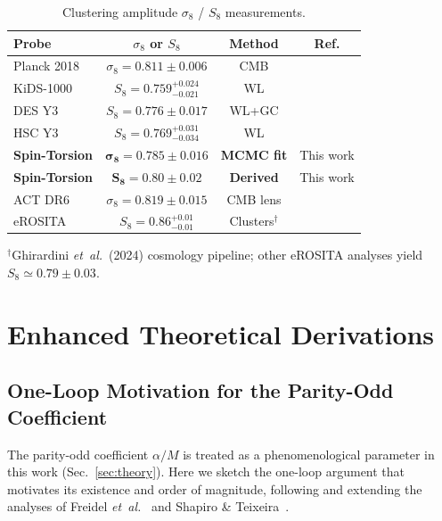 \documentclass[aps,prd,twocolumn,superscriptaddress,showpacs,preprintnumbers,nofootinbib,longbibliography,floatfix]{revtex4-2}
\newcommand{\etal}{\textit{et~al.}}
\begin{document}
\begin{table}[h]
\caption{\label{tab:S8data} Clustering amplitude $\sigma_8$ / $S_8$ measurements.}
\begin{ruledtabular}
\begin{tabular}{lccc}
Probe & $\sigma_8$ or $S_8$ & Method & Ref. \\
\hline
Planck 2018 & $\sigma_8 = 0.811 \pm 0.006$ & CMB & \cite{Planck2018params} \\
KiDS-1000 & $S_8 = 0.759^{+0.024}_{-0.021}$ & WL & \cite{KiDS2021} \\
DES Y3 & $S_8 = 0.776 \pm 0.017$ & WL+GC & \cite{DES2024} \\
HSC Y3 & $S_8 = 0.769^{+0.031}_{-0.034}$ & WL & \cite{HSC2023} \\
\textbf{Spin-Torsion} & $\bm{\sigma_8 = 0.785 \pm 0.016}$ & \textbf{MCMC fit} & This work \\
\textbf{Spin-Torsion} & $\bm{S_8 = 0.80 \pm 0.02}$ & \textbf{Derived} & This work \\
ACT DR6 & $\sigma_8 = 0.819 \pm 0.015$ & CMB lens & \cite{ACT2024} \\
eROSITA & $S_8 = 0.86^{+0.01}_{-0.01}$ & Clusters$^\dagger$ & \cite{eROSITA2024} \\
\end{tabular}
\end{ruledtabular}
{\small $^\dagger$Ghirardini \etal\ (2024) cosmology pipeline; other eROSITA analyses yield $S_8 \simeq 0.79\pm 0.03$.}
\end{table}


\section{Enhanced Theoretical Derivations}\label{sec:derivations}

\subsection{One-Loop Motivation for the Parity-Odd Coefficient}\label{sec:oneloopfull}

The parity-odd coefficient $\alpha/M$ is treated as a phenomenological parameter in this work (Sec.~\ref{sec:theory}). Here we sketch the one-loop argument that motivates its existence and order of magnitude, following and extending the analyses of Freidel \etal~\cite{Freidel2005} and Shapiro \& Teixeira~\cite{ShapiroTeixeira2014}.
\end{document}
